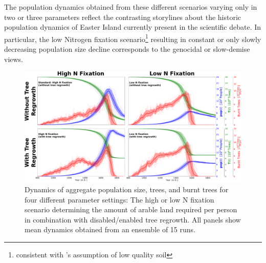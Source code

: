 The population dynamics obtained from these different scenarios varying only in two or three parameters reflect the contrasting storylines about the historic population dynamics of Easter Island currently present in the scientific debate.
In particular, the low Nitrogen fixation scenario\footnote{consistent with \citet{Hunt2007}'s assumption of low quality soil} resulting in constant or only slowly decreasing population size decline corresponds to the genocidal \citep{Hunt2007} or slow-demise \citep{Brandt2015} views.



\begin{figure}
	\centering
	\includegraphics[width=1.3\textwidth, center]{images/Results/Standard/EnsembleStatistics_allTheories}
	\caption{Dynamics of aggregate population size, trees, and burnt trees for four different parameter settings: The high or low N fixation scenario determining the amount of arable land required per person in combination with disabled/enabled tree regrowth.
		All panels show mean dynamics obtained from an ensemble of 15 runs.}
	\label{fig:ensemblestatisticsalltheories}
\end{figure}

